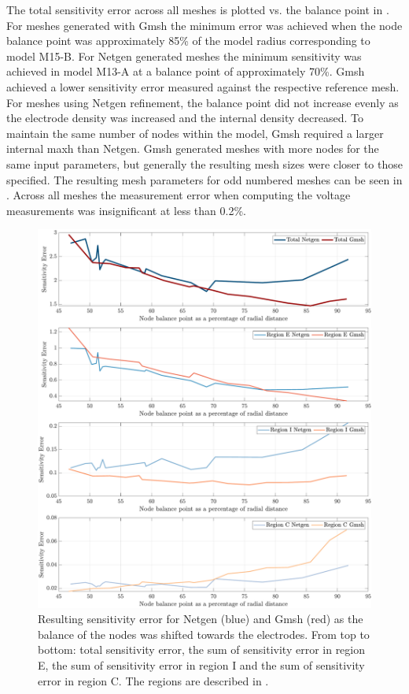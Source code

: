The total sensitivity error across all meshes is plotted vs. the balance point in
. For meshes generated with Gmsh the minimum error was 
achieved when the node balance point was approximately 85\% of the model radius corresponding
to model M15-B. 
For Netgen generated meshes the minimum sensitivity was achieved in model M13-A at a balance point
of approximately 70\%. Gmsh achieved a lower sensitivity error measured against
the respective reference mesh. For meshes using Netgen refinement, the balance point did not
increase evenly as the electrode density was increased and the internal density decreased. 
To maintain the same number of nodes within the model, Gmsh required a larger internal maxh
than Netgen. Gmsh generated meshes with more nodes for the same input
parameters, but  generally the resulting mesh sizes were closer to those specified. The
resulting mesh parameters for odd numbered meshes can be seen in .
Across all meshes the measurement error when computing the voltage measurements was insignificant
at less than 0.2\%.

\begin{figure}[H]
  \includegraphics[width=\columnwidth]{chapter4-mesh_refinement/imgs/m-mesh_sens_error_regions_split.pdf}
  \caption[Sensitivity error with shifting node balance]{\label{fig:balance_sens}
  Resulting sensitivity error for Netgen (blue) and Gmsh (red) as the balance of the nodes
  was shifted towards the electrodes. From top to bottom: total sensitivity error, the sum of 
  sensitivity error in region E, the sum of sensitivity error in region I and the sum of
  sensitivity error in region C. The regions are described in .}
\end{figure}

